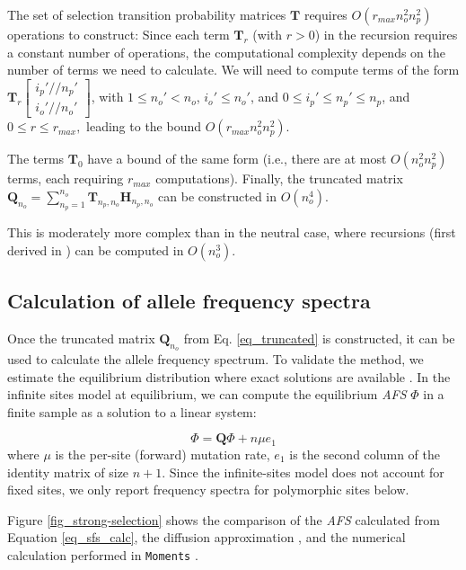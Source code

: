 \documentclass[review,nonatbib]{elsarticle}
\newcommand{\dslash}{/\!\!/}
\newcommand{\Coalc}[4]{\begin{bmatrix}#1\dslash #2 \\ #3\dslash #4 \end{bmatrix}}
\begin{document}
The set of selection transition probability matrices $\mathbf{T}$ requires $O(r_{max}n_o^2 n_p^2)$
operations to construct: Since each term $\mathbf{T}_{r}$ (with $r>0$)  in the recursion requires a constant number of operations, 
the computational complexity depends on the number of terms we need to calculate. We will need to compute terms of the form 
 $\mathbf{T}_{r}\Coalc{i_p'}{n_p'}{i_o'}{n_o'}$, with $1 \leq n_o'<n_o$, $i_o' \leq n_o'$, and $0\leq i_p' \leq n_p' \leq n_p$, 
 and $0\leq r \leq r_{max},$ leading to the bound $O(r_{max}n_o^2 n_p^2).$  
 
 
 The terms  $\mathbf{T}_{0}$ have a bound of the same form (i.e., there are at most $O(n_o^2 n_p^2)$ terms, each requiring $r_{max}$ computations).  
Finally, the truncated matrix $\mathbf{Q}_{n_o} = \sum_{n_p=1}^{n_{o}} \mathbf{T}_{n_p,n_o} \mathbf{H}_{n_p,n_o}$ can be constructed in $O(n_o^4)$.


This is moderately more complex than in the neutral case, where recursions (first derived in \cite{BhaskarEtAl2014}) can be computed in $O(n_o^3)$.

\subsection{Calculation of allele frequency spectra}
\label{subsec_afs}

Once the truncated matrix
$\mathbf{Q}_{n_o}$ from Eq. \ref{eq_truncated} is constructed, it can be used to calculate the allele frequency spectrum. To
validate the method, we estimate the equilibrium distribution where exact solutions are available
\citep{Krukov2016}. In the infinite sites model at equilibrium, we can compute the
equilibrium \textit{AFS} $\Phi$ in a finite sample as a solution to a linear system:

\begin{equation}
  \label{eq_sfs_calc}
  \Phi = \mathbf{Q}\Phi  + n \mu e_1
\end{equation}
where $\mu$ is the per-site (forward) mutation rate, $e_1$ is the second column of the identity
matrix of size $n+1.$ Since the infinite-sites model does not account for fixed sites, 
we only report frequency spectra for polymorphic sites below.
  
Figure \ref{fig_strong-selection} shows the comparison of the \textit{AFS}
calculated from Equation \ref{eq_sfs_calc}, the diffusion approximation
\cite[eq. 9.23]{Ewens2004}, and the numerical calculation performed in \texttt{Moments}
\citep{JouganousEtAl2017}. %
\end{document}
